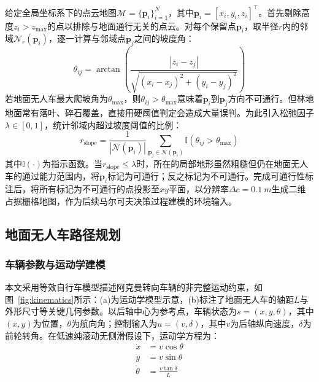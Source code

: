 \documentclass{iopjournal}
\begin{document}
给定全局坐标系下的点云地图$\mathcal{M} = \{\mathbf{p}_i\}_{i=1}^{N}$，其中$\mathbf{p}_i = [x_i, y_i, z_i]^\top$。首先剔除高度$z_i > z_{\max}$的点以排除与地面通行无关的点云。对每个保留点$\mathbf{p}_i$，取半径$r$内的邻域$\mathcal{N}_r(\mathbf{p}_i)$，逐一计算与邻域点$\mathbf{p}_j$之间的坡度角：
\begin{equation}
  \theta_{ij} = \arctan\!\left(\frac{|z_i - z_j|}{\sqrt{(x_i-x_j)^2+(y_i-y_j)^2}}\right)
\end{equation}
若地面无人车最大爬坡角为$\theta_{\max}$，则$\theta_{ij} > \theta_{\max}$意味着$\mathbf{p}_i$到$\mathbf{p}_j$方向不可通行。但林地地面常有落叶、碎石覆盖，直接用硬阈值判定会造成大量误判。为此引入松弛因子$\lambda \in [0,1]$，统计邻域内超过坡度阈值的比例：
\begin{equation}
  r_{\text{slope}} = \frac{1}{|\mathcal{N}(\mathbf{p}_i)|}\sum_{\mathbf{p}_j \in \mathcal{N}(\mathbf{p}_i)} \mathbb{I}(\theta_{ij} > \theta_{\max})
\end{equation}
其中$\mathbb{I}(\cdot)$为指示函数。当$r_{\text{slope}} \leq \lambda$时，所在的局部地形虽然粗糙但仍在地面无人车的通过能力范围内，将$\mathbf{p}_i$标记为可通行；反之标记为不可通行。完成可通行性标注后，将所有标记为不可通行的点投影至$xy$平面，以分辨率$\Delta c = \SI{0.1}{m}$生成二维占据栅格地图，作为后续马尔可夫决策过程建模的环境输入。

\subsection{地面无人车路径规划}

\subsubsection{车辆参数与运动学建模}


本文采用等效自行车模型描述阿克曼转向车辆的非完整运动约束，如图~\ref{fig:kinematics}所示：(a)为运动学模型示意，(b)标注了地面无人车的轴距$L$与外形尺寸等关键几何参数。以后轴中心为参考点，车辆状态为$s=(x,y,\theta)$，其中$(x,y)$为位置，$\theta$为航向角；控制输入为$u=(v,\delta)$，其中$v$为后轴纵向速度，$\delta$为前轮转角。在低速纯滚动无侧滑假设下，运动学方程为：
\begin{equation}
  \begin{aligned}
    \dot{x} &= v\cos\theta \\
    \dot{y} &= v\sin\theta \\
    \dot{\theta} &= \frac{v\tan\delta}{L}
  \end{aligned}
\end{equation}
\end{document}
